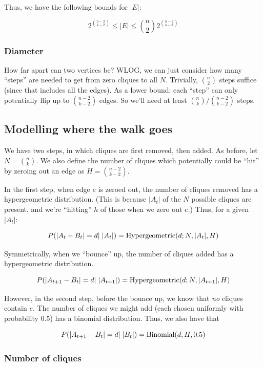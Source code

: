 \documentclass[12pt]{article}
\theoremstyle{definition}
\begin{document}
Thus, we have the following bounds for $|E|$:

\[
2^{{n-2} \choose {k-2}} \le |E| \le {n \choose 2} 2^{{n-2} \choose {k-2}}
\]

\subsubsection{Diameter}

How far apart can two vertices be? WLOG, we can just consider how many ``steps''
are needed to get from zero cliques to all $N$. Trivially, ${n \choose 2}$ steps
suffice (since that includes all the edges).
As a lower bound: each ``step'' can only potentially flip up to
${n-2 \choose k-2}$ edges. So we'll need at least ${n \choose k} / {n-2 \choose k-2}$
steps.

\subsection{Modelling where the walk goes}

We have two steps, in which cliques are first removed, then added.
As before, let $N = {n \choose k}$.
We also define the number of cliques which potentially could be ``hit'' by
zeroing out an edge as $H = {{n-2} \choose {k-2}}$.

In the first step, when edge $e$ is zeroed out, the number of cliques removed has
a hypergeometric distribution. (This is because $|A_t|$ of the $N$ possible cliques
are present, and we're ``hitting'' $h$ of those when we zero out $e$.)
Thus, for a given $|A_t|$:

\[
P(|A_t - B_t|=d|\hspace{1mm}|A_t|) = \text{Hypergeometric}(d; N, |A_t|, H)
\]

Symmetrically, when we ``bounce'' up, the number of cliques added has
a hypergeometric distribution.

\[
P(|A_{t+1} - B_t|=d|\hspace{1mm}|A_{t+1}|) = \text{Hypergeometric}(d; N, |A_{t+1}|, H)
\]

However, in the second step, before the bounce up, we know that {\em no} cliques contain $e$. The number of
cliques we might add (each chosen uniformly with probability 0.5) has 
a binomial distribution. Thus, we also have that

\[
P(|A_{t+1} - B_t|=d|\hspace{1mm}|B_t|) = \text{Binomial}(d; H, 0.5)
\]

\subsubsection{Number of cliques}
\end{document}
